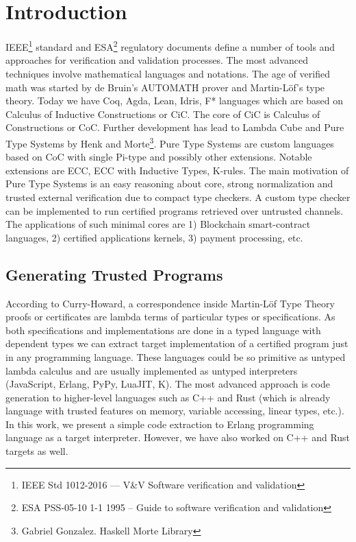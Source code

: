 \section{Introduction}
IEEE\footnote{IEEE Std 1012-2016  --- V\&V Software verification and validation} standard
and ESA\footnote{ESA PSS-05-10 1-1 1995 -- Guide to software verification and validation} regulatory documents define a number of tools and approaches for verification and validation processes. 
The most advanced techniques involve mathematical languages and notations. 
The age of verified math was started by de Bruin's AUTOMATH prover and Martin-Löf\cite{Lof84}'s type theory. 
Today we have Coq, Agda, Lean, Idris, F* languages which are based on Calculus of Inductive Constructions or CiC\cite{Mohring15}.
The core of CiC is Calculus of Constructions or CoC\cite{Coq88}.
Further development has lead to Lambda Cube\cite{Henk93} and Pure Type Systems by Henk\cite{Erik97} and Morte\footnote{Gabriel Gonzalez. Haskell Morte Library}.
Pure Type Systems are custom languages based on CoC with single Pi-type and possibly other extensions.
Notable extensions are ECC, ECC with Inductive Types\cite{Ore92}, K-rules\cite{Barthe95}.
The main motivation of Pure Type Systems is an easy reasoning about core, strong normalization and trusted external verification due to compact type checkers.
A custom type checker can be implemented to run certified programs retrieved over untrusted channels.
The applications of such minimal cores are 1) Blockchain smart-contract languages, 2) certified applications kernels, 3) payment processing, etc.

\subsection{Generating Trusted Programs}
According to Curry-Howard, a correspondence inside Martin-Löf Type Theory\cite{Lof84} proofs or certificates are lambda terms of particular types or specifications.
As both specifications and implementations are done in a typed language with dependent types we can extract target implementation of a certified program just in any programming language.
These languages could be so primitive as untyped lambda calculus and are usually implemented as untyped interpreters (JavaScript, Erlang, PyPy, LuaJIT, K).
The most advanced approach is code generation to higher-level languages such as C++ and Rust (which is already language with trusted features on memory, variable accessing, linear types, etc.).
In this work, we present a simple code extraction to Erlang programming language as a target interpreter.
However, we have also worked on C++ and Rust targets as well.


